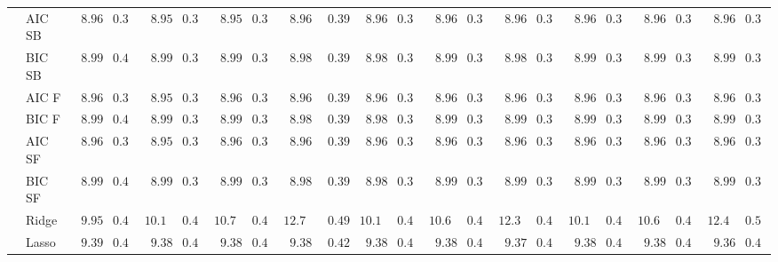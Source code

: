 \begin{tabular}{llllllllllllllllllllll}
	& AIC SB  & $\phantom{0}8.96$ & $0.39$ & $\phantom{0}8.95$ & $0.39$ & $\phantom{0}8.95$ & $0.39$ & $\phantom{0}8.96$ & $\phantom{0}0.39$ & $\phantom{0}8.96$ & $0.39$ & $\phantom{0}8.96$ & $0.39$ & $\phantom{0}8.96$ & $0.39$ & $\phantom{0}8.96$ & $0.39$ & $\phantom{0}8.96$ & $0.39$ & $\phantom{0}8.96$ & $0.39$ \\
	& BIC SB  & $\phantom{0}8.99$ & $0.40$ & $\phantom{0}8.99$ & $0.39$ & $\phantom{0}8.99$ & $0.39$ & $\phantom{0}8.98$ & $\phantom{0}0.39$ & $\phantom{0}8.98$ & $0.39$ & $\phantom{0}8.99$ & $0.39$ & $\phantom{0}8.98$ & $0.39$ & $\phantom{0}8.99$ & $0.39$ & $\phantom{0}8.99$ & $0.39$ & $\phantom{0}8.99$ & $0.39$ \\
	& AIC F  & $\phantom{0}8.96$ & $0.39$ & $\phantom{0}8.95$ & $0.39$ & $\phantom{0}8.96$ & $0.39$ & $\phantom{0}8.96$ & $\phantom{0}0.39$ & $\phantom{0}8.96$ & $0.39$ & $\phantom{0}8.96$ & $0.39$ & $\phantom{0}8.96$ & $0.39$ & $\phantom{0}8.96$ & $0.39$ & $\phantom{0}8.96$ & $0.39$ & $\phantom{0}8.96$ & $0.39$ \\
	& BIC F  & $\phantom{0}8.99$ & $0.40$ & $\phantom{0}8.99$ & $0.39$ & $\phantom{0}8.99$ & $0.39$ & $\phantom{0}8.98$ & $\phantom{0}0.39$ & $\phantom{0}8.98$ & $0.39$ & $\phantom{0}8.99$ & $0.39$ & $\phantom{0}8.99$ & $0.39$ & $\phantom{0}8.99$ & $0.39$ & $\phantom{0}8.99$ & $0.39$ & $\phantom{0}8.99$ & $0.39$ \\
	& AIC SF  & $\phantom{0}8.96$ & $0.39$ & $\phantom{0}8.95$ & $0.39$ & $\phantom{0}8.96$ & $0.39$ & $\phantom{0}8.96$ & $\phantom{0}0.39$ & $\phantom{0}8.96$ & $0.39$ & $\phantom{0}8.96$ & $0.39$ & $\phantom{0}8.96$ & $0.39$ & $\phantom{0}8.96$ & $0.39$ & $\phantom{0}8.96$ & $0.39$ & $\phantom{0}8.96$ & $0.39$ \\
	& BIC SF  & $\phantom{0}8.99$ & $0.40$ & $\phantom{0}8.99$ & $0.39$ & $\phantom{0}8.99$ & $0.39$ & $\phantom{0}8.98$ & $\phantom{0}0.39$ & $\phantom{0}8.98$ & $0.39$ & $\phantom{0}8.99$ & $0.39$ & $\phantom{0}8.99$ & $0.39$ & $\phantom{0}8.99$ & $0.39$ & $\phantom{0}8.99$ & $0.39$ & $\phantom{0}8.99$ & $0.39$ \\
	& Ridge  & $\phantom{0}9.95$ & $0.42$ & $10.16$ & $0.44$ & $10.72$ & $0.44$ & $12.72$ & $\phantom{0}0.49$ & $10.11$ & $0.43$ & $10.62$ & $0.43$ & $12.34$ & $0.47$ & $10.11$ & $0.42$ & $10.61$ & $0.42$ & $12.47$ & $0.50$ \\
	& Lasso  & $\phantom{0}9.39$ & $0.42$ & $\phantom{0}9.38$ & $0.42$ & $\phantom{0}9.38$ & $0.42$ & $\phantom{0}9.38$ & $\phantom{0}0.42$ & $\phantom{0}9.38$ & $0.41$ & $\phantom{0}9.38$ & $0.41$ & $\phantom{0}9.37$ & $0.41$ & $\phantom{0}9.38$ & $0.42$ & $\phantom{0}9.38$ & $0.42$ & $\phantom{0}9.36$ & $0.42$ \\

\end{tabular}
